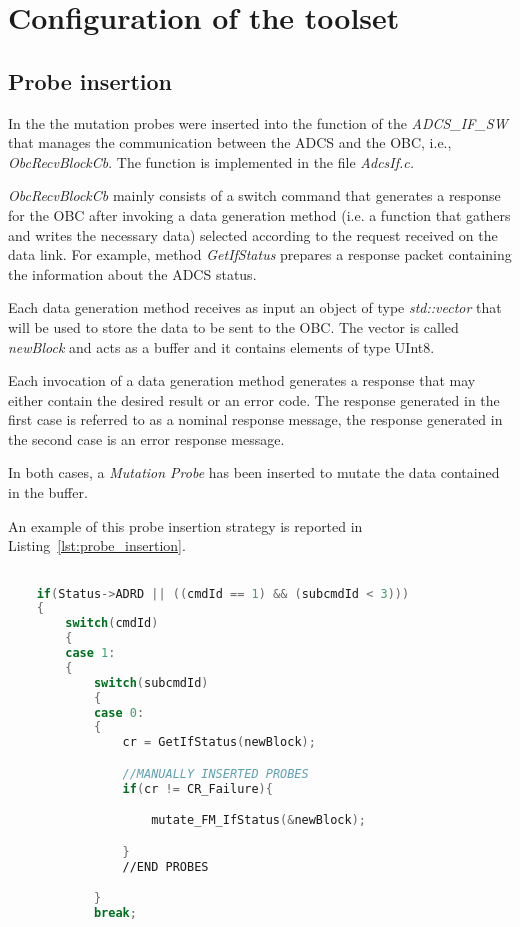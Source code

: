 
\chapter{Configuration of the toolset}

\section{Probe insertion}

In the \case the mutation probes were inserted into the function of the \emph{ADCS\_IF\_SW} that manages the communication between the ADCS and the OBC, i.e., \emph{ObcRecvBlockCb}. The function is implemented in the file \emph{AdcsIf.c.}

\emph{ObcRecvBlockCb} mainly consists of a switch command that generates a response for the OBC after invoking a data generation method (i.e. a function that gathers and writes the necessary data) selected according to the request received on the data link. For example, method \emph{GetIfStatus} prepares a response packet containing the information about the ADCS status.

Each data generation method receives as input an object of type \emph{std::vector} that will be used to store the data to be sent to the OBC. The vector is called \emph{newBlock} and acts as a buffer and it contains elements of type UInt8.

Each invocation of a data generation method generates a response that may either contain the desired result or an error code. The response generated in the first case is referred to as a nominal response message, the response generated in the second case is an error response message.

In both cases, a \emph{Mutation Probe} has been inserted to mutate the data contained in the buffer.

An example of this probe insertion strategy is reported in Listing~\ref{lst:probe_insertion}.

\begin{lstlisting}[language=C++, caption=Probe insertion Strategy, label={lst:probe_insertion}]

    if(Status->ADRD || ((cmdId == 1) && (subcmdId < 3)))
    {
        switch(cmdId)
        {
        case 1:
        {
            switch(subcmdId)
            {
            case 0:
            {
                cr = GetIfStatus(newBlock);

                //MANUALLY INSERTED PROBES
                if(cr != CR_Failure){

      		        mutate_FM_IfStatus(&newBlock);

                }
                //END PROBES

            }
            break;

\end{lstlisting}

